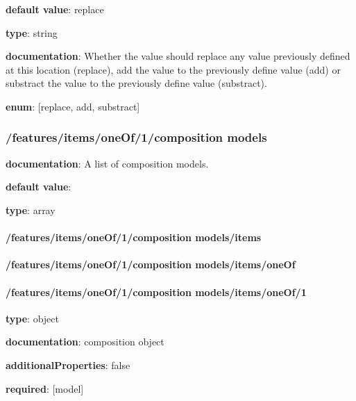 \begin{itemized}
\item {\bf default value}: replace
\item {\bf type}: string
\item {\bf documentation}: Whether the value should replace any value previously defined at this location (replace), add the value to the previously define value (add) or substract the value to the previously define value (substract).
\item {\bf enum}: [replace, add, substract]\end{itemized}\subsubsection{/features/items/oneOf/1/composition models} \begin{itemized}
\item {\bf documentation}: A list of composition models.
\item {\bf default value}: 
\item {\bf type}: array
\paragraph{/features/items/oneOf/1/composition models/items} \begin{itemized}
\end{itemized}\end{itemized}\paragraph{/features/items/oneOf/1/composition models/items/oneOf} \begin{itemized}
\end{itemized}\paragraph{/features/items/oneOf/1/composition models/items/oneOf/1} \begin{itemized}
\item {\bf type}: object
\item {\bf documentation}: composition object
\item {\bf additionalProperties}: false
\item {\bf required}: [model]\end{itemized}
